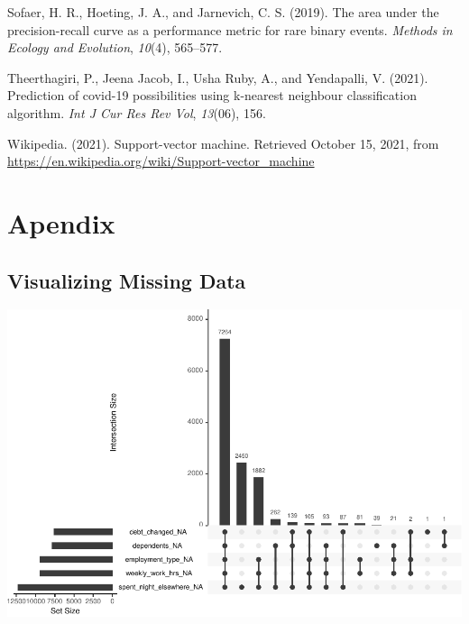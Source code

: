 \documentclass[
  10pt,
]{article}
\begin{document}
\leavevmode\hypertarget{ref-sofaer2019area}{}%
Sofaer, H. R., Hoeting, J. A., and Jarnevich, C. S. (2019). The area under the precision-recall curve as a performance metric for rare binary events. \emph{Methods in Ecology and Evolution}, \emph{10}(4), 565--577.

\leavevmode\hypertarget{ref-theerthagiri2021prediction}{}%
Theerthagiri, P., Jeena Jacob, I., Usha Ruby, A., and Yendapalli, V. (2021). Prediction of covid-19 possibilities using k-nearest neighbour classification algorithm. \emph{Int J Cur Res Rev\textbar{} Vol}, \emph{13}(06), 156.

\leavevmode\hypertarget{ref-wikipedia}{}%
Wikipedia. (2021). Support-vector machine. Retrieved October 15, 2021, from \url{https://en.wikipedia.org/wiki/Support-vector_machine}

\hypertarget{apendix}{%
\section*{Apendix}\label{apendix}}

\hypertarget{visualizing-missing-data}{%
\subsection{Visualizing Missing Data}\label{visualizing-missing-data}}

\includegraphics{phase1_report_files/figure-latex/unnamed-chunk-14-1}
\end{document}
